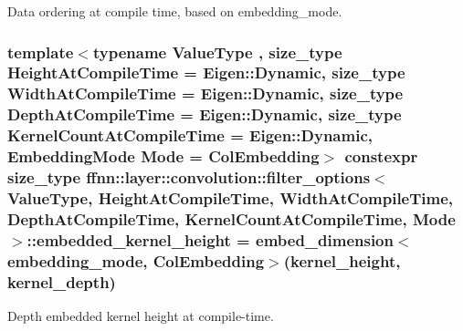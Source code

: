 Data ordering at compile time, based on embedding\-\_\-mode. 

\hypertarget{structffnn_1_1layer_1_1convolution_1_1filter__options_a2dd55949dad6dd0d9b9c355f7a56ba02}{
\subsubsection[{embedded\-\_\-kernel\-\_\-height}]{\setlength{\rightskip}{0pt plus 5cm}template$<$typename Value\-Type , size\-\_\-type Height\-At\-Compile\-Time = Eigen\-::\-Dynamic, size\-\_\-type Width\-At\-Compile\-Time = Eigen\-::\-Dynamic, size\-\_\-type Depth\-At\-Compile\-Time = Eigen\-::\-Dynamic, size\-\_\-type Kernel\-Count\-At\-Compile\-Time = Eigen\-::\-Dynamic, Embedding\-Mode Mode = Col\-Embedding$>$ constexpr {\bf size\-\_\-type} {\bf ffnn\-::layer\-::convolution\-::filter\-\_\-options}$<$ Value\-Type, Height\-At\-Compile\-Time, Width\-At\-Compile\-Time, Depth\-At\-Compile\-Time, Kernel\-Count\-At\-Compile\-Time, Mode $>$\-::embedded\-\_\-kernel\-\_\-height = {\bf embed\-\_\-dimension}$<${\bf embedding\-\_\-mode}, {\bf Col\-Embedding}$>$({\bf kernel\-\_\-height}, {\bf kernel\-\_\-depth})\hspace{0.3cm}{\ttfamily [static]}}}\label{structffnn_1_1layer_1_1convolution_1_1filter__options_a2dd55949dad6dd0d9b9c355f7a56ba02}


Depth embedded kernel height at compile-\/time. 

